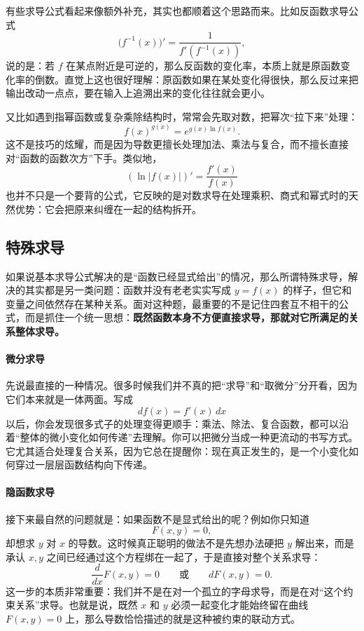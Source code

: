 \documentclass[UTF8]{ctexbook}
\begin{document}
有些求导公式看起来像额外补充，其实也都顺着这个思路而来。比如反函数求导公式
\[
\bigl(f^{-1}(x)\bigr)'=\frac{1}{f'(f^{-1}(x))},
\]
说的是：若 $f$ 在某点附近是可逆的，那么反函数的变化率，本质上就是原函数变化率的倒数。直觉上这也很好理解：原函数如果在某处变化得很快，那么反过来把输出改动一点点，要在输入上追溯出来的变化往往就会更小。

又比如遇到指幂函数或复杂乘除结构时，常常会先取对数，把幂次“拉下来”处理：
\[
 f(x)^{g(x)}=e^{g(x)\ln f(x)}.
\]
这不是技巧的炫耀，而是因为导数更擅长处理加法、乘法与复合，而不擅长直接对“函数的函数次方”下手。类似地，
\[
(\ln|f(x)|)'=\frac{f'(x)}{f(x)}
\]
也并不只是一个要背的公式，它反映的是对数求导在处理乘积、商式和幂式时的天然优势：它会把原来纠缠在一起的结构拆开。

\subsection{特殊求导}
如果说基本求导公式解决的是“函数已经显式给出”的情况，那么所谓特殊求导，解决的其实都是另一类问题：函数并没有老老实实写成 $y=f(x)$ 的样子，但它和变量之间依然存在某种关系。面对这种题，最重要的不是记住四套互不相干的公式，而是抓住一个统一思想：\textbf{既然函数本身不方便直接求导，那就对它所满足的关系整体求导。}

\paragraph{微分求导}
先说最直接的一种情况。很多时候我们并不真的把“求导”和“取微分”分开看，因为它们本来就是一体两面。写成
\[
 df(x)=f'(x)\,dx
\]
以后，你会发现很多式子的处理变得更顺手：乘法、除法、复合函数，都可以沿着“整体的微小变化如何传递”去理解。你可以把微分当成一种更流动的书写方式。它尤其适合处理复合关系，因为它总在提醒你：现在真正发生的，是一个小变化如何穿过一层层函数结构向下传递。

\paragraph{隐函数求导}
接下来最自然的问题就是：如果函数不是显式给出的呢？例如你只知道
\[
F(x,y)=0,
\]
却想求 $y$ 对 $x$ 的导数。这时候真正聪明的做法不是先想办法硬把 $y$ 解出来，而是承认 $x,y$ 之间已经通过这个方程绑在一起了，于是直接对整个关系求导：
\[
\frac{d}{dx}F(x,y)=0
\qquad\text{或}\qquad
 dF(x,y)=0.
\]
这一步的本质非常重要：我们并不是在对一个孤立的字母求导，而是在对“这个约束关系”求导。也就是说，既然 $x$ 和 $y$ 必须一起变化才能始终留在曲线 $F(x,y)=0$ 上，那么导数恰恰描述的就是这种被约束的联动方式。
\end{document}
